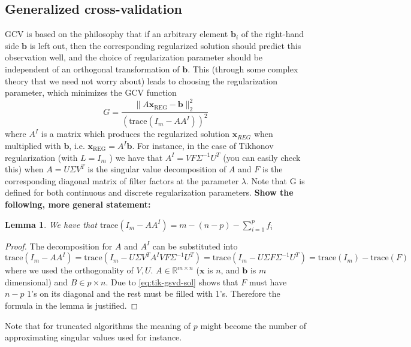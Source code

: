 \documentclass{article}
\newcommand{\mbf}[1]{\mathbf{#1}}
\newtheorem{lemma}{Lemma}
\begin{document}
	\subsection{Generalized cross-validation}
	GCV is based on the philosophy that if an arbitrary element $\mbf{b}_i$ of the right-hand side $\mbf{b}$ is left out, then the corresponding regularized solution should predict this observation well, and the choice of
	regularization parameter should be independent of an orthogonal transformation of $\mbf{b}$. This (through some complex theory that we need not worry about) leads to choosing the regularization parameter, which minimizes the GCV function
	$$G =\frac{\|A\mbf{x}_{\text{REG}} - \mbf{b}\|_2^2}{(\text{trace}(I_m - AA^I ))^2}$$
	where $A^I$ is a matrix which produces the regularized solution $\mbf{x}_{REG}$ when multiplied with $\mbf{b}$, i.e.
	$\mbf{x}_{\text{REG}} = A^I \mbf{b}$. For instance, in the case of Tikhonov regularization (with $L = I_m$ ) we have that
	$A^I = V F \Sigma^{-1}U^T$ (you can easily check this) when $A = U \Sigma V^T$ is the singular value decomposition of $A$ and $F$ is the corresponding diagonal matrix of filter factors at the parameter $\lambda$. Note that G
	is defined for both continuous and discrete regularization parameters. \textbf{Show the following, more general statement:}
	\begin{lemma}
		We have that $\text{trace}(I_m - AA^I ) = m - (n -p) - \sum_{i=1}^p f_i$
	\end{lemma}
	\begin{proof}
		The decomposition for $A$ and $A^I$ can be substituted into 
		\begin{equation}
			\text{trace}(I_m - AA^I ) = \text{trace}(I_m - U \Sigma V^T A^I V F \Sigma^{-1}U^T ) = \text{trace}(I_m - U \Sigma  F \Sigma^{-1}U^T ) = \text{trace}(I_m) - \text{trace}(F)
		\end{equation}
		where we used the orthogonality of $V, U$. $A\in\mathbb{R}^{m\times n}$ ($\textbf{x}$ is $n$, and $\textbf{b}$ is $m$ dimensional) and $B \in p \times n$. Due to \autoref{eq:tik-gsvd-sol} shows that $F$ must have $n-p$ $1$'s on its diagonal and the rest must be filled with 1's. Therefore the formula in the lemma is justified.
	\end{proof}
	 Note that for truncated algorithms the meaning of $p$ might become the number of approximating singular values used for instance. 
	 
\end{document}
